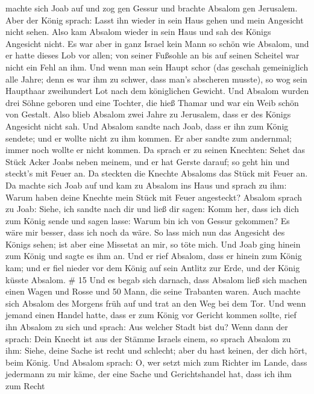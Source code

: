 machte sich Joab auf und zog gen Gessur und brachte Absalom gen
Jerusalem.  Aber der König sprach: Lasst ihn wieder in sein
Haus gehen und mein Angesicht nicht sehen. Also kam Absalom wieder in
sein Haus und sah des Königs Angesicht nicht.  Es war aber
in ganz Israel kein Mann so schön wie Absalom, und er hatte dieses Lob
vor allen; von seiner Fußsohle an bis auf seinen Scheitel war nicht ein
Fehl an ihm.  Und wenn man sein Haupt schor (das geschah
gemeiniglich alle Jahre; denn es war ihm zu schwer, dass man's abscheren
musste), so wog sein Haupthaar zweihundert Lot nach dem königlichen
Gewicht.  Und Absalom wurden drei Söhne geboren und eine
Tochter, die hieß Thamar und war ein Weib schön von Gestalt.
 Also blieb Absalom zwei Jahre zu Jerusalem, dass er des
Königs Angesicht nicht sah.  Und Absalom sandte nach Joab,
dass er ihn zum König sendete; und er wollte nicht zu ihm kommen. Er
aber sandte zum andernmal; immer noch wollte er nicht kommen.
 Da sprach er zu seinen Knechten: Sehet das Stück Acker
Joabs neben meinem, und er hat Gerste darauf; so geht hin und steckt's
mit Feuer an. Da steckten die Knechte Absaloms das Stück mit Feuer an.
 Da machte sich Joab auf und kam zu Absalom ins Haus und
sprach zu ihm: Warum haben deine Knechte mein Stück mit Feuer
angesteckt?  Absalom sprach zu Joab: Siehe, ich sandte nach
dir und ließ dir sagen: Komm her, dass ich dich zum König sende und
sagen lasse: Warum bin ich von Gessur gekommen? Es wäre mir besser, dass
ich noch da wäre. So lass mich nun das Angesicht des Königs sehen; ist
aber eine Missetat an mir, so töte mich.  Und Joab ging
hinein zum König und sagte es ihm an. Und er rief Absalom, dass er
hinein zum König kam; und er fiel nieder vor dem König auf sein Antlitz
zur Erde, und der König küsste Absalom. \# 15  Und es begab
sich darnach, dass Absalom ließ sich machen einen Wagen und Rosse und 50
Mann, die seine Trabanten waren.  Auch machte sich Absalom
des Morgens früh auf und trat an den Weg bei dem Tor. Und wenn jemand
einen Handel hatte, dass er zum König vor Gericht kommen sollte, rief
ihn Absalom zu sich und sprach: Aus welcher Stadt bist du? Wenn dann der
sprach: Dein Knecht ist aus der Stämme Israels einem,  so
sprach Absalom zu ihm: Siehe, deine Sache ist recht und schlecht; aber
du hast keinen, der dich hört, beim König.  Und Absalom
sprach: O, wer setzt mich zum Richter im Lande, dass jedermann zu mir
käme, der eine Sache und Gerichtshandel hat, dass ich ihm zum Recht
